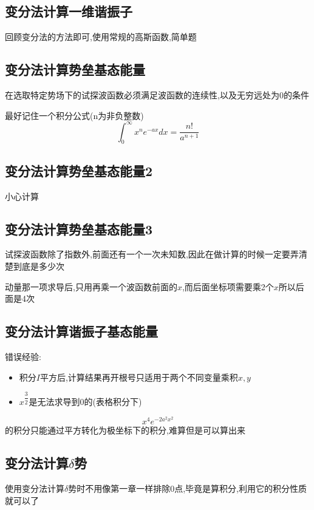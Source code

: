         \subsection{变分法计算一维谐振子}
            回顾变分法的方法即可,使用常规的高斯函数,简单题
        
        \subsection{变分法计算势垒基态能量}
            \begin{formal}
                在选取特定势场下的试探波函数必须满足波函数的连续性,以及无穷远处为0的条件

                最好记住一个积分公式(n为非负整数)
                $$ \int_{0}^{\infty} x^{n} e^{-ax} dx  = \dfrac{n!}{a^{n+1}} $$
            \end{formal}
        
        
        \subsection{变分法计算势垒基态能量2}
            小心计算


        \subsection{变分法计算势垒基态能量3}
            试探波函数除了指数外,前面还有一个一次未知数,因此在做计算的时候一定要弄清楚到底是多少次

            动量那一项求导后,只用再乘一个波函数前面的$x$,而后面坐标项需要乘2个$x$所以后面是4次

        \subsection{变分法计算谐振子基态能量}
            错误经验:
            \begin{itemize}
                \item 积分$I$平方后,计算结果再开根号只适用于两个不同变量乘积$x , y$
                \item $x^{\dfrac{3}{2}}$是无法求导到0的(表格积分下)
            \end{itemize}
        $$ x^{4} e^{-2a^{2}x^{2}} $$的积分只能通过平方转化为极坐标下的积分,难算但是可以算出来
    
            
        
        \subsection{变分法计算\texorpdfstring{$\delta$}{}势}
            使用变分法计算$\delta$势时不用像第一章一样排除0点,毕竟是算积分,利用它的积分性质就可以了      
            
